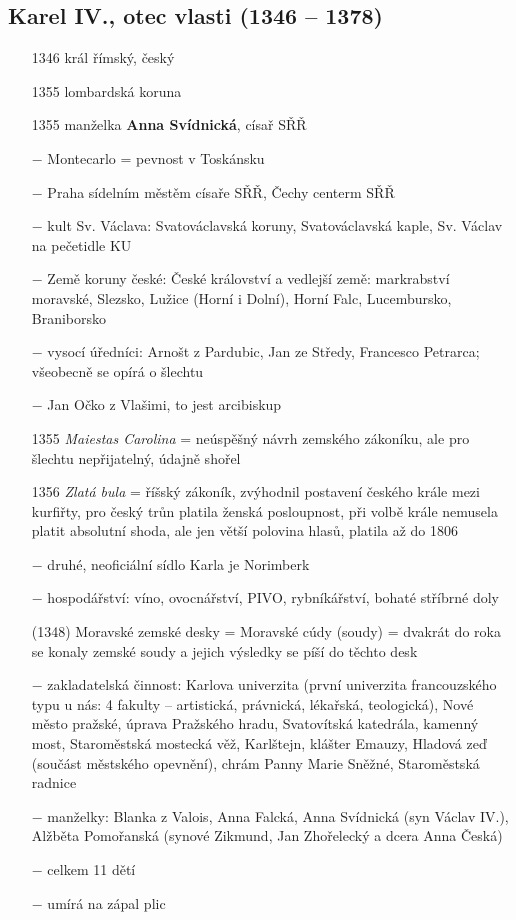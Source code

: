 \documentclass{article}
\begin{document}
\subsection*{Karel IV., otec vlasti (1346 -- 1378)}
\begin{itemize}
    \vspace{-0.5em}
    \setlength\itemsep{0.15em}
    \item[1346] král římský, český
    \item[1355] lombardská koruna
    \item[1355] manželka \textbf{Anna Svídnická}, císař SŘŘ
    \item[$-$] Montecarlo = pevnost v Toskánsku
    \item[$-$] Praha sídelním městěm císaře SŘŘ, Čechy centerm SŘŘ
    \item[$-$] kult Sv. Václava: Svatováclavská koruny, Svatováclavská kaple, Sv. Václav na pečetidle KU
    \item[$-$] Země koruny české: České království a vedlejší země: markrabství moravské, Slezsko, Lužice (Horní i Dolní), Horní Falc, Lucembursko, Braniborsko
    \item[$-$] vysocí úředníci: Arnošt z Pardubic, Jan ze Středy, Francesco Petrarca; všeobecně se opírá o šlechtu
    \item[$-$] Jan Očko z Vlašimi, to jest arcibiskup
    \item[1355] \textit{Maiestas Carolina} = neúspěšný návrh zemského zákoníku, ale pro šlechtu nepřijatelný, údajně shořel
    \item[1356]  \textit{Zlatá bula} = říšský zákoník, zvýhodnil postavení českého krále mezi kurfiřty, pro český trůn platila ženská posloupnost, při volbě krále nemusela platit absolutní shoda, ale jen větší polovina hlasů, platila až do 1806
    \item[$-$] druhé, neoficiální sídlo Karla je Norimberk
    \item[$-$] hospodářství: víno, ovocnářství, PIVO, rybníkářství, bohaté stříbrné doly
    \item[(1348)] Moravské zemské desky = Moravské cúdy (soudy) = dvakrát do roka se konaly zemské soudy a jejich výsledky se píší do těchto desk
    \item[$-$] zakladatelská činnost: Karlova univerzita (první univerzita francouzského typu u nás: 4 fakulty -- artistická, právnická, lékařská, teologická), Nové město pražské, úprava Pražského hradu, Svatovítská katedrála, kamenný most, Staroměstská mostecká věž, Karlštejn, klášter Emauzy, Hladová zeď (součást městského opevnění), chrám Panny Marie Sněžné, Staroměstská radnice
    \item[$-$] manželky: Blanka z Valois, Anna Falcká, Anna Svídnická (syn Václav IV.), Alžběta Pomořanská (synové Zikmund, Jan Zhořelecký a dcera Anna Česká)
    \item[$-$] celkem 11 dětí
    \item[$-$] umírá na zápal plic
\end{itemize}
\end{document}
